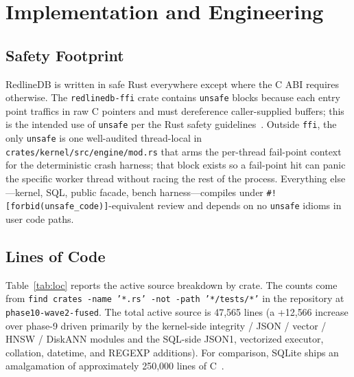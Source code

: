 \section{Implementation and Engineering}\label{sec:impl}

\subsection{Safety Footprint}
RedlineDB is written in safe Rust everywhere except where the C ABI
requires otherwise. The \texttt{redlinedb-ffi} crate contains
\texttt{unsafe} blocks because each entry point traffics in raw C
pointers and must dereference caller-supplied buffers; this is the
intended use of \texttt{unsafe} per the Rust safety
guidelines~\cite{rust_unsafe_guidelines,jung2021rustbelt}. Outside
\texttt{ffi}, the only \texttt{unsafe} is one well-audited
thread-local in \texttt{crates/kernel/src/engine/mod.rs} that arms
the per-thread fail-point context for the deterministic crash
harness; that block exists so a fail-point hit can panic the
specific worker thread without racing the rest of the
process. Everything else---kernel, SQL, public facade, bench
harness---compiles under \texttt{\#![forbid(unsafe\_code)]}-equivalent
review and depends on no \texttt{unsafe} idioms in user code paths.

\subsection{Lines of Code}
Table~\ref{tab:loc} reports the active source breakdown by crate. The
counts come from \texttt{find crates -name '*.rs' -not -path
'*/tests/*'} in the repository at \texttt{phase10-wave2-fused}. The
total active source is 47{,}565 lines (a +12{,}566 increase over
phase-9 driven primarily by the kernel-side integrity / JSON / vector /
HNSW / DiskANN modules and the SQL-side JSON1, vectorized executor,
collation, datetime, and REGEXP additions). For comparison, SQLite
ships an amalgamation of approximately 250{,}000 lines of
C~\cite{sqlite_footprint}.

